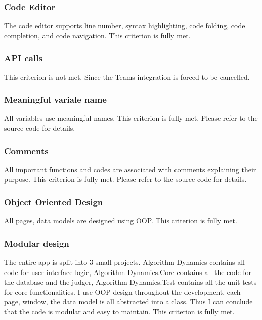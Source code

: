 \documentclass[report.tex]{subfiles}
\begin{document}
\subsubsection{Code Editor}

The code editor supports line number, syntax highlighting, code folding, code completion, and code navigation. This criterion is fully met.

\subsubsection{API calls}

This criterion is not met. Since the Teams integration is forced to be cancelled.

\subsubsection{Meaningful variale name}

All variables use meaningful names. This criterion is fully met. Please refer to the source code for details.

\subsubsection{Comments}

All important functions and codes are associated with comments explaining their purpose. This criterion is fully met. Please refer to the source code for details.

\subsubsection{Object Oriented Design}

All pages, data models are designed using OOP. This criterion is fully met.

\subsubsection{Modular design}

The entire app is split into 3 small projects. Algorithm Dynamics contains all code for user interface logic, Algorithm Dynamics.Core contains all the code for the database and the judger, Algorithm Dynamics.Test contains all the unit tests for core functionalities. I use OOP design throughout the development, each page, window, the data model is all abstracted into a class. Thus I can conclude that the code is modular and easy to maintain. This criterion is fully met.
\end{document}
